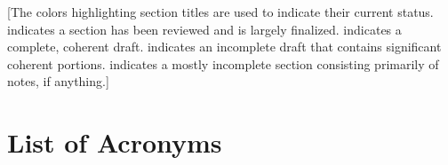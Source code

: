 \setcounter{tocdepth}{3}

\cleardoublepage


\begingroup
\let\clearpage\endgroup

[The colors highlighting section titles are used to indicate their current status.  indicates a section has been reviewed and is largely finalized.  indicates a complete, coherent draft. \hlc[yellow]{Yellow]} indicates an incomplete draft that contains significant coherent portions.  indicates a mostly incomplete section consisting primarily of notes, if anything.]

\tableofcontents
\newpage
\listoffigures
\newpage
\listoftables
\newpage
\chapter*{List of Acronyms}

